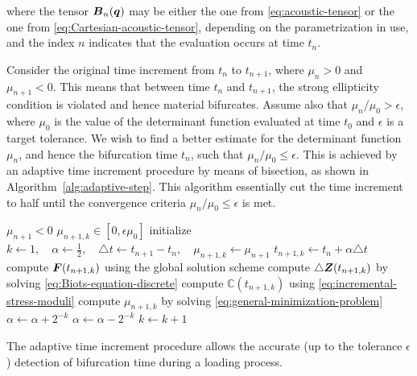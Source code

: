 \documentclass[12pt]{article}
\newcommand{\mbb}[1]{\mathbb{#1}}
\numberwithin{equation}{section}
\begin{document}
where the tensor ${\boldsymbol{B}}_n({\boldsymbol{q}})$ may be either the one from
\eqref{eq:acoustic-tensor} or the one from
\eqref{eq:Cartesian-acoustic-tensor}, depending on the parametrization
in use, and the index $n$ indicates that the evaluation occurs at time
$t_n$. 

Consider the original time increment from $t_n$ to $t_{n+1}$, where 
$\mu_n > 0$ and $\mu_{n+1} < 0$. This means that between time $t_n$ and 
$t_{n+1}$, the strong ellipticity condition is violated and hence 
material bifurcates. Assume also that $\mu_n / \mu_0 > \epsilon$, where 
$\mu_0$ is the value of the determinant function evaluated at time 
$t_0$ and $\epsilon$ is a target tolerance. We wish to find a better 
estimate for the determinant function $\mu_n$, and hence the 
bifurcation time $t_n$, such that $\mu_n / \mu_0 \le \epsilon$. This is 
achieved by an adaptive time increment procedure by means of bisection, 
as shown in Algorithm~\ref{alg:adaptive-step}. This algorithm 
essentially cut the time increment to half until the convergence 
criteria $\mu_n / \mu_0 \le \epsilon$ is met.

\begin{algorithm}
  \caption{$\text{AdaptiveStep}(\mu_0, \mu_{n+1}, t_{n+1}, \epsilon)$}
  \begin{algorithmic}
    \REQUIRE $\mu_{n+1} < 0$
    \ENSURE $\mu_{n+1,k} \in [0, \epsilon \mu_0]$
    \STATE initialize
    $k \leftarrow 1,
    \quad
    \alpha \leftarrow \frac{1}{2},
    \quad
    \triangle t \leftarrow t_{n+1} - t_n,
    \quad
    \mu_{n+1,k} \leftarrow \mu_{n+1}$
    \STATE $t_{n+1,k} \leftarrow t_n + \alpha \triangle t$
    \STATE compute ${\boldsymbol{F}}(t_{n+1,k})$ using the global solution scheme
    \STATE compute $\triangle {\boldsymbol{Z}}(t_{n+1,k})$
    by solving \eqref{eq:Biots-equation-discrete}
    \STATE compute $\mbb{C}(t_{n+1,k})$
    using \eqref{eq:incremental-stress-moduli}
    \STATE compute $\mu_{n+1,k}$
    by solving \eqref{eq:general-minimization-problem}
    \STATE $\alpha \leftarrow \alpha + 2^{-k}$
    \ELSE
    \STATE $\alpha \leftarrow \alpha - 2^{-k}$
    \ENDIF
    \STATE $k \leftarrow k+1$
    \ENDWHILE
  \end{algorithmic}
  \label{alg:adaptive-step}
\end{algorithm}

The adaptive time increment procedure allows the accurate (up to the tolerance $\epsilon$) detection of bifurcation time during a loading process.
\end{document}
